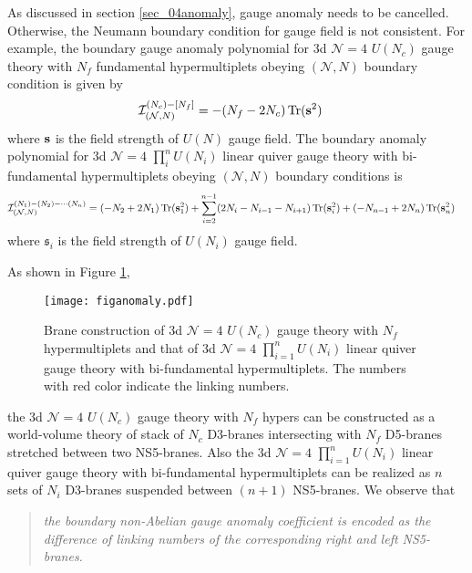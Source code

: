 \documentclass{article}
\DeclareMathOperator*{\Tr}{{\rm Tr}}
\numberwithin{equation}{section}
\begin{document}
As discussed in section \ref{sec_04anomaly}, gauge anomaly needs to be cancelled. 
Otherwise, the Neumann boundary condition for gauge field is not consistent. 
For example, 
the boundary gauge anomaly polynomial for 
3d $\mathcal{N}=4$  $U(N_{c})$ gauge theory with $N_{f}$ fundamental hypermultiplets obeying 
$(\mathcal{N}, N)$ boundary condition is given by 
\begin{align}
\label{ncnf_AN}
\mathcal{I}_{(\mathcal{N},N)}^{(N_{c})-[N_{f}]}
&=
-(N_{f}-2N_{c})\Tr ({\bf s}^{2})
\end{align}
where ${\bf s}$ is the field strength of $U(N)$ gauge field. 
The boundary anomaly polynomial for 3d $\mathcal{N}=4$ $\prod_{i}^{n} U(N_{i})$ 
linear quiver gauge theory with bi-fundamental hypermultiplets 
obeying $(\mathcal{N},N)$ boundary conditions is 
\
\begin{align}
\label{quiver_N_AN}
\mathcal{I}^{(N_{1})-(N_{2})- \cdots (N_{n})}_{(\mathcal{N}, N)}
&=(-N_{2}+2N_{1})
\Tr ({\bf s}_{1}^{2})
+\sum_{i=2}^{n-1}(2N_{i}-N_{i-1}-N_{i+1})\Tr ({\bf s}_{i}^{2})
+(-N_{n-1}+2N_{n})\Tr ({\bf s}_{n}^{2})
\end{align}
where $\mathfrak{s}_{i}$ is the field strength of $U(N_{i})$ gauge field. 

As shown in Figure \ref{figanomaly}, 
\begin{figure}
\begin{center}
\texttt{[image: figanomaly.pdf]}
\caption{Brane construction of 3d $\mathcal{N}=4$ $U(N_{c})$ gauge theory with $N_{f}$ hypermultiplets and 
that of 3d $\mathcal{N}=4$ $\prod_{i=1}^{n} U(N_{i})$ 
linear quiver gauge theory with bi-fundamental hypermultiplets. 
The numbers with red color indicate the linking numbers. }
\label{figanomaly}
\end{center}
\end{figure}
the 3d $\mathcal{N}=4$ $U(N_{c})$ gauge theory with $N_{f}$ hypers 
can be constructed as a world-volume theory of stack of $N_{c}$ D3-branes 
intersecting with $N_{f}$ D5-branes stretched between two NS5-branes. 
Also the 3d $\mathcal{N}=4$ $\prod_{i=1}^{n} U(N_{i})$ 
linear quiver gauge theory with bi-fundamental hypermultiplets can be 
realized as $n$ sets of $N_{i}$ D3-branes suspended between 
$(n+1)$ NS5-branes. 
We observe that 
\begin{quote}
\textit{
the boundary non-Abelian gauge anomaly coefficient   
is encoded as the difference of linking numbers of 
the corresponding right and left NS5-branes.}
\end{quote}
\end{document}
